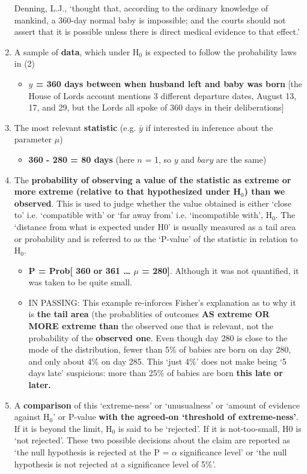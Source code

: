 \documentclass[]{book}
\providecommand{\tightlist}{%
  \setlength{\itemsep}{0pt}\setlength{\parskip}{0pt}}
\begin{document}
\begin{enumerate}
  Denning, L.J., `thought that, according to the ordinary knowledge of mankind, a 360-day normal baby is
  impossible; and the courts should not assert that it is possible unless there is direct medical evidence to that effect.'
\item
  A sample of \textbf{data}, which under H\(_0\) is expected to follow the probability laws in (2)

  \begin{itemize}
  \tightlist
  \item
    \textbf{\(y\) = 360 days between when husband left and baby was born} {[}the House of Lords account mentions 3 different departure dates, August 13, 17, and 29, but the Lords all spoke of 360 days in their deliberations{]}
  \end{itemize}
\item
  The most relevant \textbf{statistic} (e.g. \(\bar{y}\) if interested in inference about the parameter \(\mu\))

  \begin{itemize}
  \tightlist
  \item
    \textbf{360 - 280 = 80 days} (here \(n\) = 1, so \(y\) and \(bar{y}\) are the same)
  \end{itemize}
\item
  The \textbf{probability of observing a value of the statistic as extreme or more extreme (relative to that hypothesized under H\(_0\)) than we observed}. This is used to judge whether the value obtained is either `close to' i.e. `compatible with' or `far away from' i.e. `incompatible with', H\(_0\). The `distance from what is expected under H0' is usually measured as a tail area or probability and is referred to as the `P-value' of the statistic in relation to H\(_0\).

  \begin{itemize}
  \item
    \textbf{P = Prob{[} 360 or 361 \ldots{} \textbar{} \(\mu\) = 280{]}}. Although it was not quantified, it was taken to be quite small.
  \item
    IN PASSING: This example re-inforces Fisher's explanation as to why it is \textbf{the tail area} (the probablities of outcomes \textbf{AS extreme OR MORE extreme than} the observed one that is relevant, not the probability of the \textbf{observed one}. Even though day 280 is close to the mode of the distribution, fewer than 5\% of babies are born on day 280, and only about 4\% on day 285. This `just 4\%' does not make being `5 days late' suspicious: more than 25\% of babies are born \textbf{this late or later.}
  \end{itemize}
\item
  A \textbf{comparison} of this `extreme-ness' or `unusualness' or `amount of evidence against H\(_0\)' or P-value \textbf{with the agreed-on `threshold of extreme-ness'}. If it is beyond the limit, H\(_0\) is said to be `rejected'. If it is not-too-small, H0 is `not rejected'. These two possible decisions about the claim are reported as `the null hypothesis is rejected at the P = \(\alpha\) significance level' or `the null hypothesis is not rejected at a significance level of 5\%'.


\end{enumerate}
\end{document}
